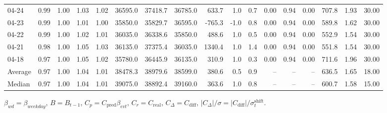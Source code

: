 \begin{threeparttable}
{\begin{tabular}{lrrrrrrrrrrrrrrrr}
  04-24 &         0.99 &           1.00 &          1.03 &          1.02 & 36595.0 & 37418.7 & 36785.0 &      633.7 &                      1.0 &                 0.7 &       0.00 &      0.94 &           0.00 &            707.8 &            1.93 &                  30.00 \\
  04-23 &         0.99 &           1.00 &          1.01 &          1.00 & 35850.0 & 35829.7 & 36595.0 &     -765.3 &                     -1.0 &                 0.8 &       0.00 &      0.94 &           0.00 &            589.8 &            1.62 &                  30.00 \\
  04-22 &         0.99 &           1.00 &          1.02 &          1.01 & 36035.0 & 36338.6 & 35850.0 &      488.6 &                      1.0 &                 0.5 &       0.00 &      0.94 &           0.00 &            552.9 &            1.54 &                  30.00 \\
  04-21 &         0.98 &           1.00 &          1.05 &          1.03 & 36135.0 & 37375.4 & 36035.0 &     1340.4 &                      1.0 &                 1.4 &       0.00 &      0.94 &           0.00 &            551.8 &            1.54 &                  30.00 \\
  04-18 &         0.97 &           1.00 &          1.05 &          1.02 & 35780.0 & 36445.9 & 36135.0 &      310.9 &                      1.0 &                 0.3 &       0.00 &      0.94 &           0.00 &            711.6 &            1.96 &                  30.00 \\
Average &         0.97 &           1.00 &          1.04 &          1.01 & 38478.3 & 38979.6 & 38599.0 &      380.6 &                      0.5 &                 0.9 &         -- &        -- &             -- &            636.5 &            1.65 &                  18.00 \\
 Median &         0.97 &           1.00 &          1.04 &          1.01 & 39075.0 & 38892.4 & 39160.0 &      363.6 &                      1.0 &                 0.8 &         -- &        -- &             -- &            600.7 &            1.58 &                  15.00 \\
\bottomrule
\end{tabular}
}
\begin{tablenotes}\footnotesize
\item $\beta_{wd}=\beta_{weekday}$, $B=B_{t-1}$,
$C_p=C_{\text{pred}}\beta_{evt}$, $C_r=C_{\text{real}}$,
$C_\Delta=C_{\text{diff}}$, $|C_\Delta|/\sigma=|C_{\text{diff}}|/\sigma_t^{\text{shift}}$.
\end{tablenotes}
\end{threeparttable}
\endgroup
